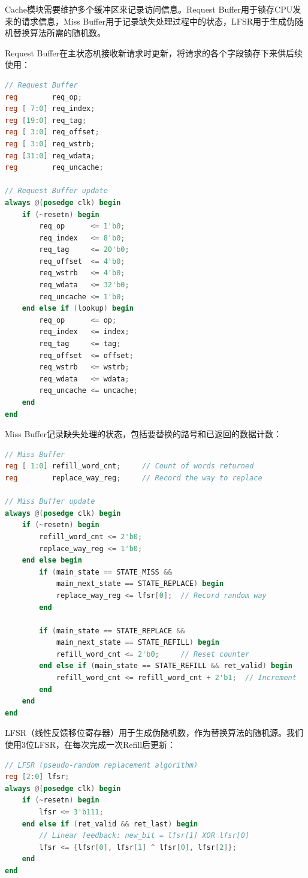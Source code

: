 \documentclass[11pt]{article}
\begin{document}
Cache模块需要维护多个缓冲区来记录访问信息。Request Buffer用于锁存CPU发来的请求信息，Miss Buffer用于记录缺失处理过程中的状态，LFSR用于生成伪随机替换算法所需的随机数。

Request Buffer在主状态机接收新请求时更新，将请求的各个字段锁存下来供后续使用：

\begin{lstlisting}[language=Verilog]
// Request Buffer
reg        req_op;
reg [ 7:0] req_index;
reg [19:0] req_tag;
reg [ 3:0] req_offset;
reg [ 3:0] req_wstrb;
reg [31:0] req_wdata;
reg        req_uncache;

// Request Buffer update
always @(posedge clk) begin
    if (~resetn) begin
        req_op      <= 1'b0;
        req_index   <= 8'b0;
        req_tag     <= 20'b0;
        req_offset  <= 4'b0;
        req_wstrb   <= 4'b0;
        req_wdata   <= 32'b0;
        req_uncache <= 1'b0;
    end else if (lookup) begin
        req_op      <= op;
        req_index   <= index;
        req_tag     <= tag;
        req_offset  <= offset;
        req_wstrb   <= wstrb;
        req_wdata   <= wdata;
        req_uncache <= uncache;
    end
end
\end{lstlisting}

Miss Buffer记录缺失处理的状态，包括要替换的路号和已返回的数据计数：

\begin{lstlisting}[language=Verilog]
// Miss Buffer
reg [ 1:0] refill_word_cnt;     // Count of words returned
reg        replace_way_reg;     // Record the way to replace

// Miss Buffer update
always @(posedge clk) begin
    if (~resetn) begin
        refill_word_cnt <= 2'b0;
        replace_way_reg <= 1'b0;
    end else begin
        if (main_state == STATE_MISS && 
            main_next_state == STATE_REPLACE) begin
            replace_way_reg <= lfsr[0];  // Record random way
        end
        
        if (main_state == STATE_REPLACE && 
            main_next_state == STATE_REFILL) begin
            refill_word_cnt <= 2'b0;     // Reset counter
        end else if (main_state == STATE_REFILL && ret_valid) begin
            refill_word_cnt <= refill_word_cnt + 2'b1;  // Increment
        end
    end
end
\end{lstlisting}

LFSR（线性反馈移位寄存器）用于生成伪随机数，作为替换算法的随机源。我们使用3位LFSR，在每次完成一次Refill后更新：

\begin{lstlisting}[language=Verilog]
// LFSR (pseudo-random replacement algorithm)
reg [2:0] lfsr;
always @(posedge clk) begin
    if (~resetn) begin
        lfsr <= 3'b111;
    end else if (ret_valid && ret_last) begin
        // Linear feedback: new_bit = lfsr[1] XOR lfsr[0]
        lfsr <= {lfsr[0], lfsr[1] ^ lfsr[0], lfsr[2]};
    end
end
\end{lstlisting}
\end{document}
